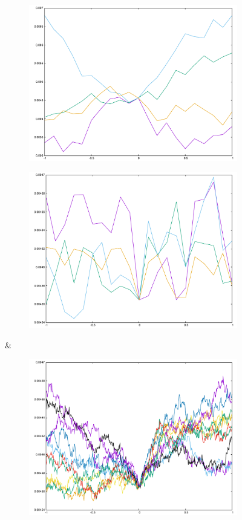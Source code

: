 \begin{figure}[H]
\begin{subfigure}{.33\textwidth}
	\includegraphics[width=\linewidth]{fig/ajherr/t3rr/L_chi.pdf}
\end{subfigure}%
\begin{subfigure}{.33\textwidth}
	\includegraphics[width=\linewidth]{fig/ajherr/t3rr/M_chi.pdf}
\end{subfigure}&
\begin{subfigure}{.33\textwidth}
	\includegraphics[width=\linewidth]{fig/ajherr/t3rr/S_chi.pdf}

\end{subfigure}
\end{figure}
